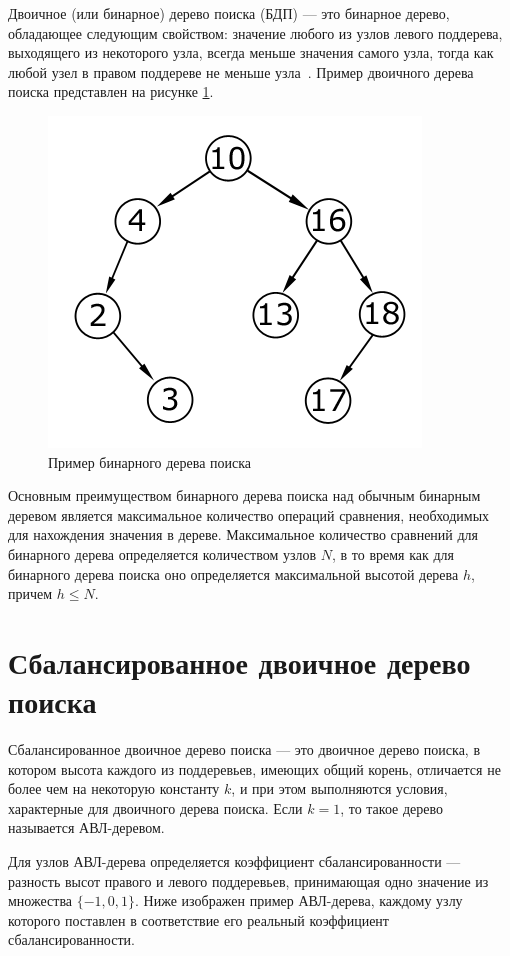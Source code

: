 Двоичное (или бинарное) дерево поиска (БДП) --- это бинарное дерево, обладающее следующим свойством: значение любого из узлов левого поддерева, выходящего из некоторого узла, всегда меньше значения самого узла, тогда как любой узел в правом поддереве не меньше узла~\cite{knut}.
Пример двоичного дерева поиска представлен на рисунке \ref{fig:search_tree_example}.

\begin{figure}[h]
	\centering
	\includegraphics[height=0.3\textheight]{img/search_tree.png}
	\caption{Пример бинарного дерева поиска}
	\label{fig:search_tree_example}
\end{figure}

Основным преимуществом бинарного дерева поиска над обычным бинарным деревом является максимальное количество операций сравнения, необходимых для нахождения значения в дереве.
Максимальное количество сравнений для бинарного дерева определяется количеством узлов $N$, в то время как для бинарного дерева поиска оно определяется максимальной высотой дерева $h$, причем $h \le N$.

\section{Сбалансированное двоичное дерево поиска}

Сбалансированное двоичное дерево поиска --- это двоичное дерево поиска, в котором высота каждого из поддеревьев, имеющих общий корень, отличается не более чем на некоторую константу $k$, и при этом выполняются условия, характерные для двоичного дерева поиска.
Если $k = 1$, то такое дерево называется АВЛ-деревом.

Для узлов АВЛ-дерева определяется коэффициент сбалансированности --- разность высот правого и левого поддеревьев, принимающая одно значение из множества $\{-1, 0, 1\}$.
Ниже изображен пример АВЛ-дерева, каждому узлу которого поставлен в соответствие его реальный коэффициент сбалансированности.

